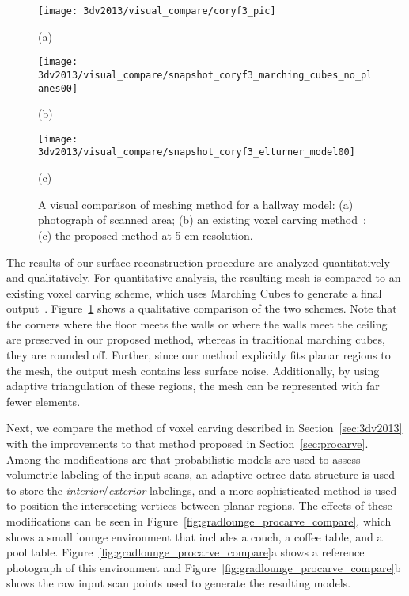\documentclass[12pt,onecolumn,oneside]{book}
\begin{document}
\begin{figure}
	
	\centering
	\begin{minipage}[b]{0.27\linewidth}
	\centerline{\texttt{[image: 3dv2013/visual\_compare/coryf3\_pic]}}
	\centerline{(a)}\medskip
	\end{minipage}
	\hfill
	\begin{minipage}[b]{0.35\linewidth}
	\centerline{\texttt{[image: 3dv2013/visual\_compare/snapshot\_coryf3\_marching\_cubes\_no\_planes00]}}
	\centerline{(b)}\medskip
	\end{minipage}
	\hfill
	\begin{minipage}[b]{0.35\linewidth}
	\centerline{\texttt{[image: 3dv2013/visual\_compare/snapshot\_coryf3\_elturner\_model00]}}
	\centerline{(c)}\medskip
	\end{minipage}

	\caption[Comparison between voxel carving methods.]{A visual comparison of meshing method for a hallway model:  (a) photograph of scanned area; (b) an existing voxel carving method~\cite{Carving}; (c) the proposed method at 5 cm resolution.}
	\label{fig:mc_compare}

\end{figure}

The results of our surface reconstruction procedure are analyzed quantitatively and qualitatively.  For quantitative analysis, the resulting mesh is compared to an existing voxel carving scheme, which uses Marching Cubes to generate a final output~\cite{Carving}.  Figure~\ref{fig:mc_compare} shows a qualitative comparison of the two schemes.  Note that the corners where the floor meets the walls or where the walls meet the ceiling are preserved in our proposed method, whereas in traditional marching cubes, they are rounded off.  Further, since our method explicitly fits planar regions to the mesh, the output mesh contains less surface noise.  Additionally, by using adaptive triangulation of these regions, the mesh can be represented with far fewer elements.

Next, we compare the method of voxel carving described in Section~\ref{sec:3dv2013} with the improvements to that method proposed in Section~\ref{sec:procarve}.  Among the modifications are that probabilistic models are used to assess volumetric labeling of the input scans, an adaptive octree data structure is used to store the {\it interior}/{\it exterior} labelings, and a more sophisticated method is used to position the intersecting vertices between planar regions.  The effects of these modifications can be seen in Figure~\ref{fig:gradlounge_procarve_compare}, which shows a small lounge environment that includes a couch, a coffee table, and a pool table.  Figure~\ref{fig:gradlounge_procarve_compare}a shows a reference photograph of this environment and Figure~\ref{fig:gradlounge_procarve_compare}b shows the raw input scan points used to generate the resulting models.  
\end{document}
